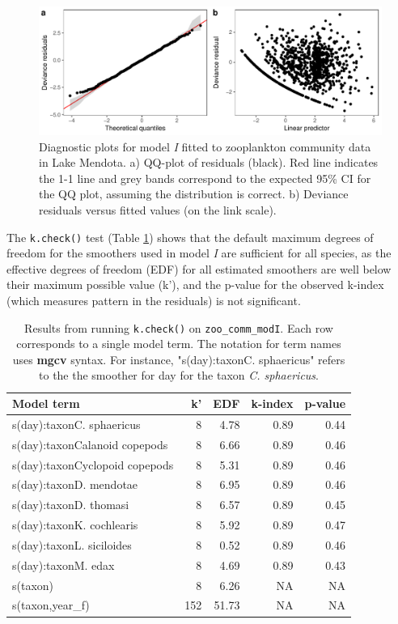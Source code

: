 \documentclass[12pt]{article}
\begin{document}
\begin{figure}
\centering
\includegraphics{../figures/Fig14.pdf}
\caption{\label{fig:Fig14} Diagnostic plots for model \emph{I} fitted to
zooplankton community data in Lake Mendota. a) QQ-plot of residuals
(black). Red line indicates the 1-1 line and grey bands correspond to
the expected 95\% CI for the QQ plot, assuming the distribution is
correct. b) Deviance residuals versus fitted values (on the link
scale).}
\end{figure}

The \texttt{k.check()} test (Table \ref{tab:zoo_comm_check_k_kable})
shows that the default maximum degrees of freedom for the smoothers used
in model \emph{I} are sufficient for all species, as the effective
degrees of freedom (EDF) for all estimated smoothers are well below
their maximum possible value (k'), and the p-value for the observed
k-index (which measures pattern in the residuals) is not significant.

\begin{table}[t]

\caption{\label{tab:zoo_comm_check_k_kable}Results from running \texttt{k.check()} on \texttt{zoo\_comm\_modI}. Each row corresponds to a single model term. The notation for term names uses \textbf{mgcv} syntax. For instance, "s(day):taxonC. sphaericus" refers to the the smoother for day for the taxon \textit{C. sphaericus}.}
\centering
\begin{tabular}{lrrrr}
\toprule
Model term & k' & EDF & k-index & p-value\\
\midrule
s(day):taxonC. sphaericus & 8 & 4.78 & 0.89 & 0.44\\
s(day):taxonCalanoid copepods & 8 & 6.66 & 0.89 & 0.46\\
s(day):taxonCyclopoid copepods & 8 & 5.31 & 0.89 & 0.46\\
s(day):taxonD. mendotae & 8 & 6.95 & 0.89 & 0.46\\
s(day):taxonD. thomasi & 8 & 6.57 & 0.89 & 0.45\\
\addlinespace
s(day):taxonK. cochlearis & 8 & 5.92 & 0.89 & 0.47\\
s(day):taxonL. siciloides & 8 & 0.52 & 0.89 & 0.46\\
s(day):taxonM. edax & 8 & 4.69 & 0.89 & 0.43\\
s(taxon) & 8 & 6.26 & NA & NA\\
s(taxon,year\_f) & 152 & 51.73 & NA & NA\\
\bottomrule
\end{tabular}
\end{table}
\end{document}
